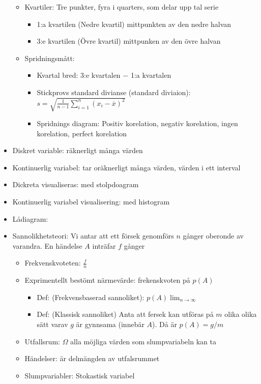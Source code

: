 \begin{multicols}{2}
\begin{itemize}
\begin{itemize}
\begin{itemize}
        \end{itemize}
        \item Kvartiler: Tre punkter, fyra i quarters, som delar upp tal serie
        \begin{itemize}
          \item 1:a kvartilen (Nedre kvartil) mittpunkten av den nedre halvan
          \item 3:e kvartilen (Övre kvartil) mittpunken av den övre halvan
        \end{itemize}
        \item Spridningsmått:
        \begin{itemize}
            \item Kvartal bred: 3:e kvartalen $-$ 1:a kvartalen
            \item Stickprovs standard divianse (standard diviaion): $s=\sqrt{\frac{1}{n-1}\sum_{i=1}^{n}(x_i - \overline{x})^2}$
            \item Spridnings diagram: Positiv korelation, negativ korelation, ingen korelation, perfect korelation
        \end{itemize}
    \end{itemize}
    \item Diskret variable: räknerligt många värden
    \item Kontinuerlig variabel: tar oräknerligt många värden, värden i ett interval
    \item Dickreta visualiseras: med stolpdoagram
    \item Kontinuerlig variabel visualisering: med histogram
    \item Lådiagram:
    \item Sannolikhetsteori: Vi antar att ett försek genomförs $n$ gånger oberonde av varandra. En händelse $A$ inträfar $f$ gånger
    \begin{itemize}
      \item Frekvenskvoteten: $\frac{f}{n}$
      \item Exprimentellt bestömt närmevärde: frekenskvoten på $p(A)$
        \begin{itemize}
          \item Def: (Frekvensbaserad sannoliket): $p(A) \lim_{n\to\infty}$
            \item Def: (Klassisk sannoliket) Anta att fersek kan utföras på $m$ olika olika sätt varav $g$ är gynnsama (innebär $A$). Då är $p(A)=g/m$
        \end{itemize}
      \item Utfallsrum: $\Omega$ alla möjliga värden som slumpvariabeln kan ta
      \item Händelser: är delmängden av utfalsrummet
      \item Slumpvariabler: Stokastisk variabel
    \end{itemize}
\end{itemize}


\end{multicols}
